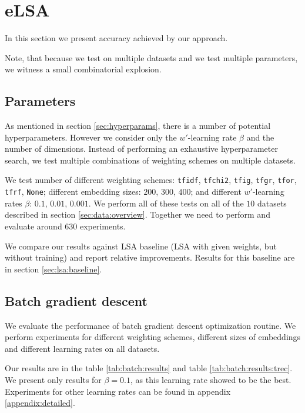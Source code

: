 \section{eLSA}
    
    In this section we present accuracy achieved by our approach.
    
    Note, that because we test on multiple datasets and we test multiple parameters, we witness a small combinatorial explosion.

    \subsection{Parameters}
    
    As mentioned in section \ref{sec:hyperparams}, there is a number of potential hyperparameters. 
    However we consider only the $w'$-learning rate $\beta$ and the number of dimensions.
    Instead of performing an exhaustive hyperparameter search, we test multiple combinations of weighting schemes on multiple datasets. 
    
    \* %
    We test number of different weighting schemes: \texttt{tfidf}, \texttt{tfchi2}, \texttt{tfig}, \texttt{tfgr}, \texttt{tfor}, \texttt{tfrf}, \texttt{None};
    different embedding sizes: $200$, $300$, $400$;
    and different $w'$-learning rates $\beta$: $0.1$, $0.01$, $0.001$.
    We perform all of these tests on all of the $10$ datasets described in section \ref{sec:data:overview}.
    Together we need to perform and evaluate around $630$ experiments.
    
    We compare our results against LSA baseline (LSA with given weights, but without training) and report relative improvements.
    Results for this baseline are in section \ref{sec:lsa:baseline}.
    
    \subsection{Batch gradient descent}
    We evaluate the performance of batch gradient descent optimization routine.
    We perform experiments for different weighting schemes, different sizes of embeddings and different learning rates on all datasets.

    Our results are in the table \ref{tab:batch:results} and table \ref{tab:batch:results:trec}.
    We present only results for $\beta=0.1$, as this learning rate showed to be the best. 
    Experiments for other learning rates can be found in appendix \ref{appendix:detailed}.
    
